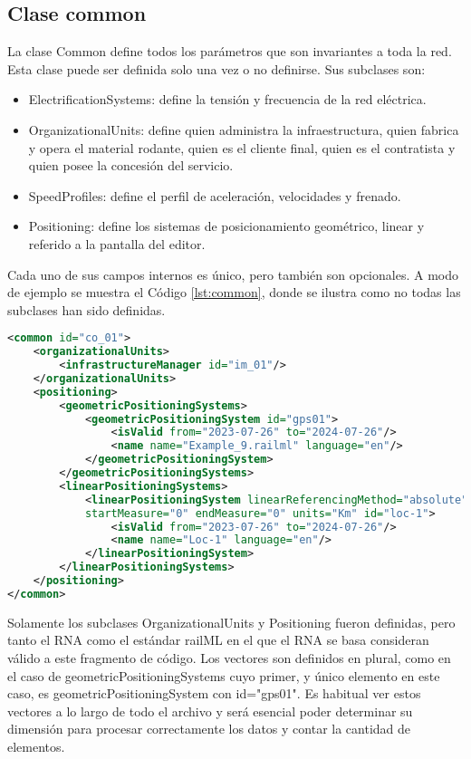 \subsection{Clase common}
    \label{sec:common}

    La clase Common define todos los parámetros que son invariantes a toda la red. Esta clase puede ser definida solo una vez o no definirse. Sus subclases son:

    \begin{itemize}
        \item ElectrificationSystems: define la tensión y frecuencia de la red eléctrica.
        \item OrganizationalUnits: define quien administra la infraestructura, quien fabrica y opera el material rodante, quien es el cliente final, quien es el contratista y quien posee la concesión del servicio. 
        \item SpeedProfiles: define el perfil de aceleración, velocidades y frenado.
        \item Positioning: define los sistemas de posicionamiento geométrico, linear y referido a la pantalla del editor.
    \end{itemize}

    Cada uno de sus campos internos es único, pero también son opcionales. A modo de ejemplo se muestra el Código \ref{lst:common}, donde se ilustra como no todas las subclases han sido definidas.
    
    \begin{lstlisting}[language = XML, caption = Clase Common , label = {lst:common}]
<common id="co_01">
    <organizationalUnits>
        <infrastructureManager id="im_01"/>
    </organizationalUnits>
    <positioning>
        <geometricPositioningSystems>
            <geometricPositioningSystem id="gps01">
                <isValid from="2023-07-26" to="2024-07-26"/>
                <name name="Example_9.railml" language="en"/>
            </geometricPositioningSystem>
        </geometricPositioningSystems>
        <linearPositioningSystems>
            <linearPositioningSystem linearReferencingMethod="absolute" 
            startMeasure="0" endMeasure="0" units="Km" id="loc-1">
                <isValid from="2023-07-26" to="2024-07-26"/>
                <name name="Loc-1" language="en"/>
            </linearPositioningSystem>
        </linearPositioningSystems>
    </positioning>
</common>
    \end{lstlisting}

    Solamente los subclases OrganizationalUnits y Positioning fueron definidas, pero tanto el RNA como el estándar railML en el que el RNA se basa consideran válido a este fragmento de código. Los vectores son definidos en plural, como en el caso de geometricPositioningSystems cuyo primer, y único elemento en este caso, es geometricPositioningSystem con id="gps01". Es habitual ver estos vectores a lo largo de todo el archivo y será esencial poder determinar su dimensión para procesar correctamente los datos y contar la cantidad de elementos.